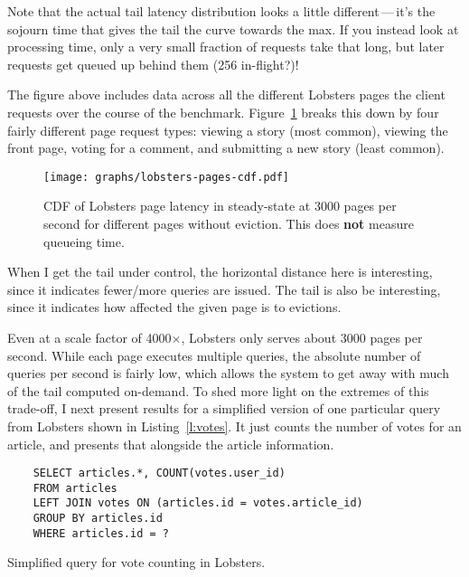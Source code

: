 \begin{inprogress}
  Note that the actual tail latency distribution looks a little
  different\,---\,it's the sojourn time that gives the tail the curve towards
  the max. If you instead look at processing time, only a very small fraction of
  requests take that long, but later requests get queued up behind them (256
  in-flight?)!
\end{inprogress}

The figure above includes data across all the different Lobsters pages the
client requests over the course of the benchmark.
Figure~\ref{f:lobsters-pages-latency} breaks this down by four fairly
different page request types: viewing a story (most common), viewing the front
page, voting for a comment, and submitting a new story (least common).

\begin{figure}[ht]
  \centering
  \texttt{[image: graphs/lobsters-pages-cdf.pdf]}
  \caption{CDF of Lobsters page latency in steady-state at 3000 pages per second
  for different pages without eviction. This does \textbf{not} measure queueing
  time.}
  \label{f:lobsters-pages-latency}
\end{figure}

\begin{inprogress}
  When I get the tail under control, the horizontal distance here is
  interesting, since it indicates fewer/more queries are issued. The tail is
  also be interesting, since it indicates how affected the given page is to
  evictions.
\end{inprogress}

Even at a scale factor of 4000$\times$, Lobsters only serves about 3000 pages
per second. While each page executes multiple queries, the absolute number of
queries per second is fairly low, which allows the system to get away with much
of the tail computed on-demand. To shed more light on the extremes of this
trade-off, I next present results for a simplified version of one particular
query from Lobsters shown in Listing~\ref{l:votes}. It just counts the number of
votes for an article, and presents that alongside the article information.

\begin{listing}[ht]
  \begin{verbatim}
    SELECT articles.*, COUNT(votes.user_id)
    FROM articles
    LEFT JOIN votes ON (articles.id = votes.article_id)
    GROUP BY articles.id
    WHERE articles.id = ?
  \end{verbatim}
  \caption{Simplified query for vote counting in Lobsters.}
  \label{l:votes}
\end{listing}

